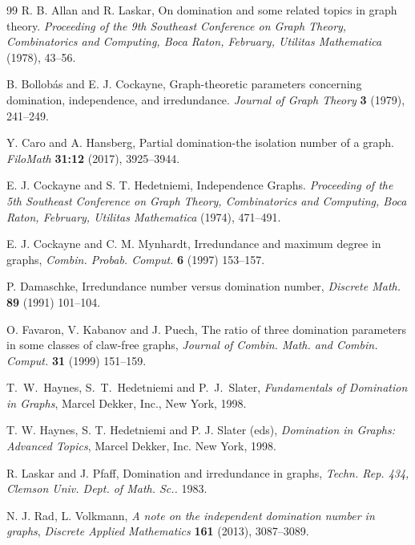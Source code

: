 \documentclass[11pt]{article}
\newcommand{\2}{ \vspace{0.2cm} }
\newcommand{\1}{ \vspace{0.1cm} }
\begin{document}
\medskip
\begin{thebibliography}{99}
 R. B. Allan and R. Laskar, On domination and some related topics in graph theory. \textit{Proceeding of the 9th Southeast Conference on Graph Theory, Combinatorics and Computing, Boca Raton, February, Utilitas Mathematica} (1978), 43--56.

 B. Bollob\'{a}s and E. J. Cockayne, Graph-theoretic parameters concerning domination, independence, and irredundance. \textit{Journal of Graph Theory} \textbf{3} (1979), 241--249.

 Y. Caro and A. Hansberg, Partial domination-the isolation number of a graph. \textit{FiloMath} \textbf{31:12} (2017), 3925--3944.

 E. J. Cockayne and S. T. Hedetniemi, Independence Graphs. \textit{Proceeding of the 5th Southeast Conference on Graph Theory, Combinatorics and Computing, Boca Raton, February, Utilitas Mathematica} (1974), 471--491.

 E. J. Cockayne and C. M. Mynhardt, Irredundance and maximum degree in graphs, \textit{Combin. Probab. Comput.} \textbf{6} (1997) 153--157.



 P. Damaschke, Irredundance number versus domination number, \textit{Discrete Math.} \textbf{89} (1991) 101--104.



 O. Favaron, V. Kabanov and J. Puech, The ratio of three domination parameters in some classes of claw-free graphs, \textit{Journal of Combin. Math. and Combin. Comput.} \textbf{31} (1999) 151--159.

  T.\ W.\ Haynes, S.\ T.\ Hedetniemi and P.\ J.\ Slater, \emph{Fundamentals of Domination in Graphs}, Marcel Dekker, Inc., New York, 1998.

 T. W. Haynes, S. T. Hedetniemi and P. J. Slater (eds), \emph{Domination  in Graphs: Advanced Topics}, Marcel Dekker, Inc. New York, 1998.




 R. Laskar and J. Pfaff, Domination and irredundance in graphs, \textit{Techn. Rep. 434, Clemson Univ. Dept. of Math. Sc..} 1983.


 N. J. Rad, L. Volkmann, \emph{A note on the independent domination number in graphs}, \textit{Discrete Applied Mathematics} \textbf{161} (2013), 3087--3089.


\end{thebibliography}
\end{document}
